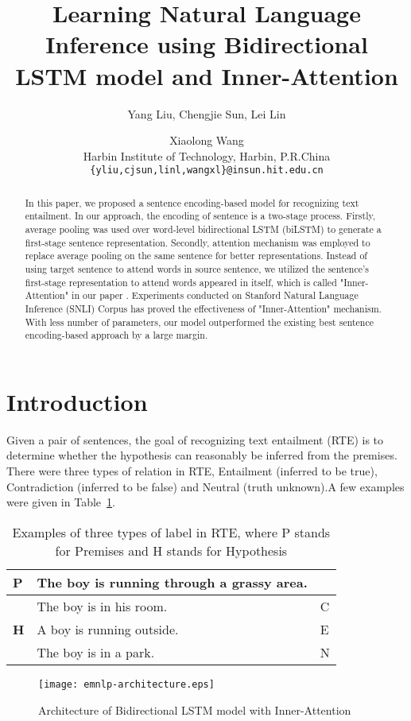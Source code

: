 \documentclass[11pt,letterpaper]{article}
\title{Learning Natural Language Inference using Bidirectional LSTM model and Inner-Attention}
\author{Yang Liu, Chengjie Sun, Lei Lin\and Xiaolong Wang\\
         Harbin Institute of Technology, Harbin, P.R.China \\ {\tt \{yliu,cjsun,linl,wangxl\}@insun.hit.edu.cn}}
\date{}
\begin{document}
\maketitle

\begin{abstract}
  In this paper, we proposed a sentence encoding-based model for recognizing text entailment. In our approach, the encoding of sentence is a two-stage process. Firstly, average pooling was used over word-level bidirectional LSTM (biLSTM) to generate a first-stage sentence representation. Secondly, attention mechanism was employed to replace average pooling on the same sentence for better representations. Instead of using target sentence to attend words in source sentence, we utilized the sentence's first-stage representation to attend words appeared in itself, which is called "Inner-Attention" in our paper . Experiments conducted on Stanford Natural Language Inference (SNLI) Corpus has proved the effectiveness of "Inner-Attention" mechanism.  With less number of parameters, our model outperformed the existing best sentence encoding-based approach by a large margin.
\end{abstract}

\section{Introduction}
Given a pair of sentences, the goal of recognizing text entailment (RTE) is to determine whether the hypothesis can reasonably be inferred from the premises. There were three types of relation in RTE, Entailment (inferred to be true), Contradiction (inferred to be false) and Neutral (truth unknown).A few examples were given in Table~\ref{RTEexamples}.
  \begin{table}[]
  \small
  \centering
  \label{my-label}
  \begin{tabular}{|l|l|l|}
  \hline
  \textbf{P}    & The boy is running through a grassy area. &   \\ \hline
                & The boy is in his room.                         & C \\ \cline{2-3}
  \textbf{H}    & A boy is running outside.                       & E \\ \cline{2-3}
                & The boy is in a park.                           & N \\ \hline
  \end{tabular}
  \caption{Examples of three types of label in RTE, where P stands for Premises and H stands for Hypothesis}
  \label{RTEexamples}
  \end{table}
  \begin{figure*}[htbp]
  \centering
  \texttt{[image: emnlp-architecture.eps]}
  \caption{Architecture of Bidirectional LSTM model with Inner-Attention}
  \label{arc}
  \end{figure*}
\end{document}
